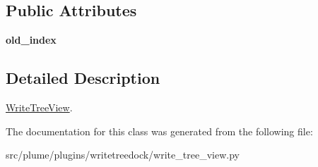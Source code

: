 \subsection*{Public Attributes}
\begin{DoxyCompactItemize}
\item 
{\bfseries old\+\_\+index}\hypertarget{classplume-creator_1_1src_1_1plume_1_1plugins_1_1writetreedock_1_1write__tree__view_1_1_write_tree_view_a364fdbf36373289aa3311de34df06ede}{}\label{classplume-creator_1_1src_1_1plume_1_1plugins_1_1writetreedock_1_1write__tree__view_1_1_write_tree_view_a364fdbf36373289aa3311de34df06ede}

\end{DoxyCompactItemize}


\subsection{Detailed Description}
\hyperlink{classplume-creator_1_1src_1_1plume_1_1plugins_1_1writetreedock_1_1write__tree__view_1_1_write_tree_view}{Write\+Tree\+View}. 

The documentation for this class was generated from the following file\+:\begin{DoxyCompactItemize}
\item 
src/plume/plugins/writetreedock/write\+\_\+tree\+\_\+view.\+py\end{DoxyCompactItemize}
